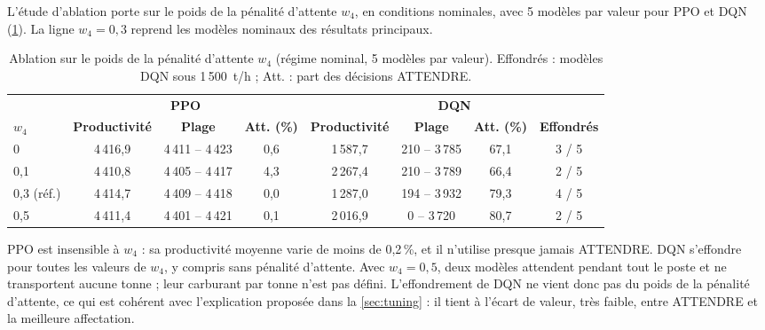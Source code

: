 \documentclass[11pt,a4paper]{article}
\newif\ifrevmarks
\newcommand{\revtag}[1]{\ifrevmarks\textsuperscript{\textcolor{red!70!black}{\scriptsize[#1]}}\fi}
\newenvironment{revbloc}[1]{\par\ifrevmarks\color{revcolor}\noindent\revtag{#1}\ \fi}{\par}
\newif\ifcorrmarks
\newcommand{\corr}[1]{\ifcorrmarks\textcolor{corrcolor}{#1}\else#1\fi}
\begin{document}
\begin{revbloc}{T31}
L'étude d'ablation porte sur le poids de la pénalité d'attente $w_4$, en conditions nominales, avec 5 modèles par valeur pour PPO et DQN (\cref{tab:ablation}). La ligne $w_4 = 0{,}3$ reprend les modèles nominaux des résultats principaux.

\begin{table}[H]
\centering
\caption{Ablation sur le poids de la pénalité d'attente $w_4$ (régime nominal, 5 modèles par valeur). Effondrés : modèles DQN sous 1\,500~t/h\corr{ ; Att. : part des décisions ATTENDRE}.}
\label{tab:ablation}
\footnotesize
\setlength{\tabcolsep}{3pt}
\begin{tabular}{@{}l|ccc|cccc@{}}
\toprule
 & \multicolumn{3}{c|}{\textbf{PPO}} & \multicolumn{4}{c}{\textbf{DQN}} \\
\textbf{$w_4$} & \textbf{Productivité} & \textbf{Plage} & \textbf{Att. (\%)} & \textbf{Productivité} & \textbf{Plage} & \textbf{Att. (\%)} & \textbf{Effondrés} \\
\midrule
0          & 4\,416,9 & 4\,411 -- 4\,423 & 0,6 & 1\,587,7 & 210 -- 3\,785 & 67,1 & 3 / 5 \\
0,1        & 4\,410,8 & 4\,405 -- 4\,417 & 4,3 & 2\,267,4 & 210 -- 3\,789 & 66,4 & 2 / 5 \\
0,3 (réf.) & 4\,414,7 & 4\,409 -- 4\,418 & 0,0 & 1\,287,0 & 194 -- 3\,932 & 79,3 & 4 / 5 \\
0,5        & 4\,411,4 & 4\,401 -- 4\,421 & 0,1 & 2\,016,9 & 0 -- 3\,720 & 80,7 & 2 / 5 \\
\bottomrule
\end{tabular}
\end{table}

PPO est insensible à $w_4$ : sa \corr{productivité moyenne varie de moins de 0,2\,\%}, et il n'utilise presque jamais ATTENDRE. DQN s'effondre pour toutes les valeurs de $w_4$, y compris sans pénalité d'attente. Avec $w_4 = 0{,}5$, deux modèles attendent pendant tout le poste et ne transportent aucune tonne ; leur carburant par tonne n'est pas défini. L'effondrement de DQN ne vient donc pas du poids de la pénalité d'attente, ce qui est cohérent avec l'explication proposée dans la \cref{sec:tuning} : il tient à l'écart de valeur, très faible, entre ATTENDRE et la meilleure affectation.


\end{revbloc}
\end{document}
